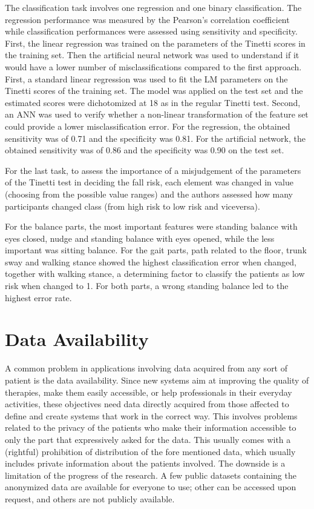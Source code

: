 The classification task involves one regression and one binary classification. The regression performance was measured by the Pearson's correlation coefficient while classification performances were assessed using sensitivity and specificity.
First, the linear regression was trained on the parameters of the Tinetti scores in the training set. Then the artificial neural network was used to understand if it would have a lower number of misclassifications compared to the first approach. 
First, a standard linear regression was used to fit the LM parameters
on the Tinetti scores of the training set. The model was applied on the
test set and the estimated scores were dichotomized at 18 as in the
regular Tinetti test.
Second, an ANN was used to verify whether a non-linear transformation of the feature set could provide a lower misclassification error.
For the regression, the obtained sensitivity was of 0.71 and the specificity was 0.81.
For the artificial network, the obtained sensitivity was of 0.86 and the specificity was 0.90 on the test set.

For the last task, to assess the importance of a misjudgement of the parameters of the Tinetti test in deciding the fall risk, each element was changed in value (choosing from the possible value ranges) and the authors assessed how many participants changed class (from high risk to low risk and viceversa).  

For the balance parts, the most important features were standing balance
with eyes closed, nudge and standing balance with eyes opened, while the less important was sitting balance.
For the gait parts, path related to the floor, trunk sway and walking stance showed the highest classification error when changed, together with walking stance, a determining factor to classify the patients as low risk when changed to 1.
For both parts, a wrong standing balance led to the highest error rate.


\section{Data Availability}
A common problem in applications involving data acquired from any sort of patient is the data availability. Since new systems aim at improving the quality of therapies, make them easily accessible, or help professionals in their everyday activities, these objectives need data directly acquired from those affected to define and create systems that work in the correct way. This involves problems related to the privacy of the patients who make their information accessible to only the part that expressively asked for the data. This usually comes with a (rightful) prohibition of distribution of the fore mentioned data, which usually includes private information about the patients involved. The downside is a limitation of the progress of the research. 
A few public datasets containing the anonymized data are available for everyone to use; other can be accessed upon request, and others are not publicly available. 

